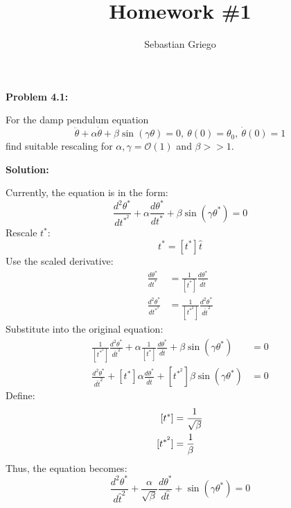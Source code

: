 \documentclass[12pt]{article}
\newenvironment{problem}[1]{
\textbf{Problem #1:}
}{
\rmfamily \vspace{1em}
}
\newenvironment{solution}{
\textbf{Solution:}

}{

\vspace{2em}
}
\begin{document}
\title{Homework \#1}  %
\author{Sebastian Griego}  %

\begin{problem}{4.1}
    For the damp pendulum equation
    \[
        \ddot{\theta} + \alpha \dot{\theta} + \beta \sin(\gamma \theta) = 0, \: \theta(0) = \theta_0, \: \dot{\theta}(0) = 1
    \]
    find suitable rescaling for \(\alpha, \gamma = \mathcal{O}(1)\) and \(\beta > > 1\).
\end{problem}

\begin{solution}
    Currently, the equation is in the form:
    \[
        \frac{d^2\theta^*}{dt^{*^2}} + \alpha \frac{d\theta^*}{dt^*} + \beta \sin(\gamma \theta^*) = 0
    \]
    Rescale \(t^*\):
    \[
        t^* = [t^*] \hat{t}
    \]
    Use the scaled derivative:
    \[
        \begin{aligned}
            \frac{d\theta^*}{dt^*} &= \frac{1}{[t^*]} \frac{d\theta^*}{d\hat{t}} \\
            \frac{d^2\theta^*}{dt^{*^2}} &= \frac{1}{[t^{*^2}]} \frac{d^2\theta^*}{d\hat{t}^2}
        \end{aligned}
    \]
    Substitute into the original equation:
    \[
        \begin{aligned}
            \frac{1}{[t^{*^2}]} \frac{d^2\theta^*}{d\hat{t}^2} + \alpha \frac{1}{[t^*]} \frac{d\theta^*}{d\hat{t}} + \beta \sin(\gamma \theta^*) &= 0 \\
            \frac{d^2\theta^*}{d\hat{t}^2} + [t^*] \alpha \frac{d\theta^*}{d\hat{t}} + [t^{*^2}] \beta \sin(\gamma \theta^*) &= 0
        \end{aligned}
    \]
    Define:
    \[
        \begin{aligned}\relax
            [t^*] &= \frac{1}{\sqrt{\beta}} \\
            [t^{*^2}] &= \frac{1}{\beta} \\
        \end{aligned}
    \]
    Thus, the equation becomes:
    \[
        \frac{d^2\theta^*}{d\hat{t}^2} + \frac{\alpha}{\sqrt{\beta}} \frac{d\theta^*}{d\hat{t}} + \sin(\gamma \theta^*) = 0
    \]
    
    
\end{solution}
\end{document}
